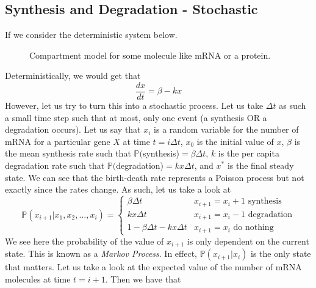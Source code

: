 \documentclass{article}
\newcommand{\od}[2]{\frac{d #1}{d #2}}
\newcommand{\p}{\mathbb{P}}
\begin{document}
\subsection{Synthesis and Degradation - Stochastic}
If we consider the deterministic system below.
\begin{figure}[htbp]
    \centering
    \caption{Compartment model for some molecule like mRNA or a protein.}
\end{figure}
Deterministically, we would get that 
\begin{equation*}
    \od{x}{t} = \beta - kx
\end{equation*}
However, let us try to turn this into a stochastic process. Let us take $\Delta t$ as such a small time step such that at most, only one event (a synthesis OR a degradation occurs). Let us say that $x_i$ is a random variable for the number of mRNA for a particular gene $X$ at time $t=i\Delta t$, $x_0$ is the initial value of $x$, $\beta$ is the mean synthesis rate such that $\p($synthesis)$=\beta \Delta t$, $k$ is the per capita degradation rate such that $\p($degradation)$=kx\Delta t$, and $x^*$ is the final steady state. We can see that the birth-death rate represents a Poisson process but not exactly since the rates change. As such, let us take a look at 
\begin{equation*}
    \p (x_{i+1}| x_1,x_2,\ldots,x_i) = \begin{cases}
        \beta \Delta t & x_{i+1}=x_i + 1 \text{ synthesis} \\ kx\Delta t & x_{i+1} = x_i -1 \text{ degradation} \\ 1-\beta \Delta t-kx\Delta t& x_{i+1}=x_i \text{ do nothing}
    \end{cases}
\end{equation*}
We see here the probability of the value of $x_{i+1}$ is only dependent on the current state. This is known as a \emph{Markov Process}. In effect, $\p (x_{i+1}|x_i)$ is the only state that matters. Let us take a look at the expected value of the number of mRNA molecules at time $t=i+1$. Then we have that 
\end{document}
